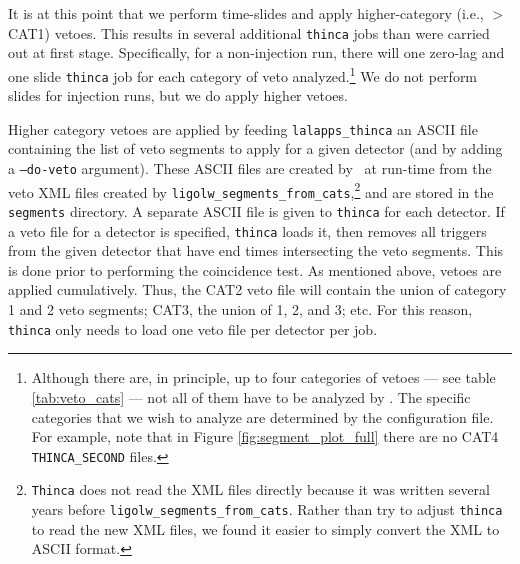 It is at this point that we perform time-slides and apply higher-category
(i.e., $>$ CAT1) vetoes. This results in several additional \texttt{thinca}
jobs than were carried out at first stage. Specifically, for a non-injection
run, there will one zero-lag and one slide \texttt{thinca} job for each
category of veto analyzed.\footnote{Although there are, in principle, up to
four categories of vetoes --- see table \ref{tab:veto_cats} --- not all of them
have to be analyzed by \hipe. The specific categories that we wish to analyze
are determined by the configuration file. For example, note that in Figure
\ref{fig:segment_plot_full} there are no CAT4 \texttt{THINCA\_SECOND} files.}
We do not perform slides for injection runs, but we do apply higher vetoes.

Higher category vetoes are applied by feeding \texttt{lalapps\_thinca} an ASCII
file containing the list of veto segments to apply for a given detector (and by
adding a \texttt{--do-veto} argument). These ASCII files are created by
\ihope~at run-time from the veto XML files created by
\texttt{ligolw\_segments\_from\_cats},\footnote{\texttt{Thinca} does not read
the XML files directly because it was written several years before
\texttt{ligolw\_segments\_from\_cats}. Rather than try to adjust
\texttt{thinca} to read the new XML files, we found it easier to simply convert
the XML to ASCII format.} and are stored in the \texttt{segments} directory. A
separate ASCII file is given to \texttt{thinca} for each detector. If a veto
file for a detector is specified, \texttt{thinca} loads it, then removes all
triggers from the given detector that have end times intersecting the veto
segments. This is done prior to performing the coincidence test. As mentioned
above, vetoes are applied cumulatively. Thus, the CAT2 veto file will contain
the union of category 1 and 2 veto segments; CAT3, the union of 1, 2, and 3;
etc. For this reason, \texttt{thinca} only needs to load one veto file per
detector per job.

